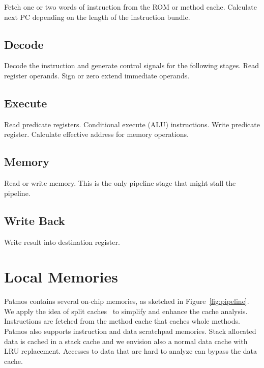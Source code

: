 \documentclass[a4paper,fontsize=10pt,twoside,DIV15,BCOR12mm,headinclude=true,footinclude=false,pagesize,bibtotoc]{scrbook}
\newcommand{\comment}[3]{

\textsf{\textbf{#1}} {\color{#3}#2}}
\newcommand{\stefan}[1]{\comment{Stefan}{#1}{RoyalPurple}}
\renewcommand{\stefan}[1]{}
\begin{document}
Fetch one or two words of instruction from the ROM or method cache.
Calculate next PC depending on the length of the instruction bundle.

\subsection{Decode}

Decode the instruction and generate control signals for the following stages.
Read register operands. Sign or zero extend immediate operands.

\subsection{Execute}

Read predicate registers. Conditional execute (ALU) instructions.
Write predicate register. Calculate effective address for memory operations.

\subsection{Memory}

Read or write memory. This is the only pipeline stage that might
stall the pipeline.

\subsection{Write Back}

Write result into destination register.

\stefan{Note that in the \texttt{pasim} simulator the Memory and Write Back stages are merged into a single MW stage at the time of writing,
and the stages are simulated from back to front.
While this has no effect on the timing and hazards of the instructions, there is only a single bypass from MW to EX (per pipeline). Apart
from that, all implementations of all instructions in the simulator should adhere to the above description of the stages.}

\section{Local Memories}

Patmos contains several on-chip memories, as sketched in Figure~\ref{fig:pipeline}.
We apply the idea of split caches~\cite{jop:dcache:rts} to simplify and enhance
the cache analysis. Instructions are fetched from the method cache that caches
whole methods. Patmos also supports instruction and data scratchpad memories.
Stack allocated data is cached in a stack cache and we envision also a normal
data cache with LRU replacement. Accesses to data that are hard to analyze can
bypass the data cache.
\end{document}
